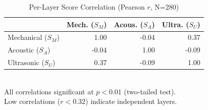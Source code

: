 \begin{table}[h]
\centering
\caption{Per-Layer Score Correlation (Pearson $r$, N=280)}
\label{tab:correlation}
\scriptsize
\begin{tabular}{lrrr}
\toprule
& \textbf{Mech. ($S_M$)} & \textbf{Acous. ($S_A$)} & \textbf{Ultra. ($S_U$)} \\
\midrule
Mechanical ($S_M$) & 1.00 & -0.04 & 0.37 \\
Acoustic ($S_A$) & -0.04 & 1.00 & -0.09 \\
Ultrasonic ($S_U$) & 0.37 & -0.09 & 1.00 \\
\bottomrule
\end{tabular}
\\[2pt]
\scriptsize All correlations significant at $p < 0.01$ (two-tailed test).\\
\scriptsize Low correlations ($r < 0.32$) indicate independent layers.
\end{table}
